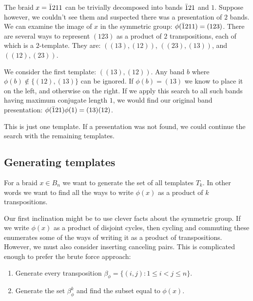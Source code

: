 \documentclass[12pt]{thesis}
\begin{document}
\begin{example}
    The braid $x = \bar{1} 2 1 1$ can be trivially decomposed into bands $\bar{1} 2 1$ and $1$.
    Suppose however, we couldn't see them and suspected there
was a presentation of $2$ bands.
We can examine the image of $x$ in the symmetric group:
    $\phi(\bar{1} 2 1 1) = (123)$.
There are several ways to represent $(123)$ as a product of $2$ transpositions,
each of which is a $2$-template.
    They are: $((13), (12))$, $((23), (13))$, and $((12), (23))$.

    We consider the first template: $((13), (12))$.
Any band $b$ where $\phi(b) \not\in \{ (12), (13) \}$ can be ignored.
 If $\phi(b) = (13)$ we know to place it on the left,
and otherwise on the right.
If we apply this search to all such bands having maximum conjugate length $1$,
    we would find our original band presentation: $\phi(\bar{1} 2 1)\phi(1) = (13)(12)$.

This is just one template.
If a presentation was not found, we could continue the search with the remaining templates.
\end{example}

\subsection{Generating templates}

For a braid $x \in B_{n}$ 
we want to generate the set of all templates $T_{k}$.
In other words we want to find all the ways
to write $\phi(x)$ as a product of $k$ transpositions.

Our first inclination might be to use clever facts about the symmetric group.
If we write $\phi(x)$ as a product of disjoint cycles,
then cycling and commuting these enumerates some of the ways of writing it as a product of transpositions.
However, we must also consider inserting canceling pairs.
This is complicated enough to prefer the brute force approach:
\begin{algorithm}

\begin{enumerate}
    \item Generate every transposition $\beta_{\phi} = \{ (i, j) \colon 1 \leq i < j \leq n \}$.
    \item Generate the set $\beta_{\phi}^{k}$ and find the subset equal to $\phi(x)$.
\end{enumerate}

\end{algorithm}
\end{document}
